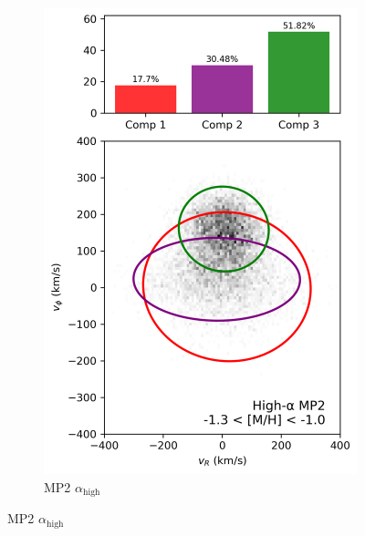 \documentclass[a4paper,10pt]{article}
\begin{document}
\begin{multicols}{2}
\begin{figure}[H]
\begin{subfigure}[t]{0.24\linewidth}
    \includegraphics[width=\linewidth]{../figures/gmm_mp2_high_alpha_k6.png}
    \caption{MP2 $\alpha_{\mathrm{high}}$}
  \end{subfigure}

  \vspace{0.5em}


\end{figure}
\end{multicols}
\end{document}

